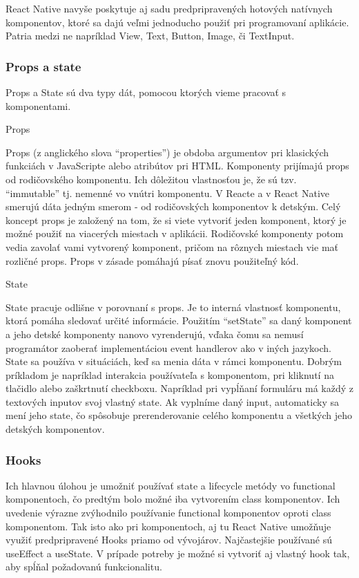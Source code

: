 React Native navyše poskytuje aj sadu predpripravených hotových natívnych komponentov, ktoré sa dajú veľmi jednoducho použiť pri programovaní aplikácie. Patria medzi ne napríklad View, Text, Button, Image, či TextInput. \\

\subsubsection{Props a state}
Props a State sú dva typy dát, pomocou ktorých vieme pracovať s komponentami.
\begin{itemize}[leftmargin=*]
{\bf \item Props} \newline
Props (z anglického slova ``properties'') je obdoba argumentov pri klasických funkciách v JavaScripte alebo atribútov pri HTML. Komponenty prijímajú props od rodičovského komponentu. Ich dôležitou vlastnosťou je, že sú tzv. ``immutable'' tj. nemenné vo vnútri komponentu. V Reacte a v React Native smerujú dáta jedným smerom - od rodičovských komponentov k detským. Celý koncept props je založený na tom, že si viete vytvoriť jeden komponent, ktorý je možné použiť na viacerých miestach v aplikácii. Rodičovské komponenty potom vedia zavolať vami vytvorený komponent, pričom na rôznych miestach vie mať rozličné props. Props v zásade pomáhajú písať znovu použiteľný kód. \cite{props}
{\bf \item State} \newline
State pracuje odlišne v porovnaní s props. Je to interná vlastnosť komponentu, ktorá pomáha sledovať určité informácie. Použitím ``setState'' sa daný komponent a jeho detské komponenty nanovo vyrenderujú, vďaka čomu sa nemusí programátor zaoberať implementáciou event handlerov ako v iných jazykoch. State sa používa v situáciách, keď sa menia dáta v rámci komponentu. Dobrým príkladom je napríklad interakcia používateľa s komponentom, pri kliknutí na tlačidlo alebo zaškrtnutí checkboxu. Napríklad pri vypĺňaní formuláru má každý z textových inputov svoj vlastný state. Ak vyplníme daný input, automaticky sa mení jeho state, čo spôsobuje prerenderovanie celého komponentu a všetkých jeho detských komponentov. \cite{props} \\
\end{itemize} 
\subsubsection{Hooks}
Ich hlavnou úlohou je umožniť používať state a lifecycle metódy vo functional komponentoch, čo predtým bolo možné iba vytvorením class komponentov. Ich uvedenie výrazne zvýhodnilo používanie functional komponentov oproti class komponentom. Tak isto ako pri komponentoch, aj tu React Native umožňuje využiť predpripravené Hooks priamo od vývojárov. Najčastejšie používané sú useEffect a useState. V prípade potreby je možné si vytvoriť aj vlastný hook tak, aby spĺňal požadovanú funkcionalitu. \cite{hooks} \\
